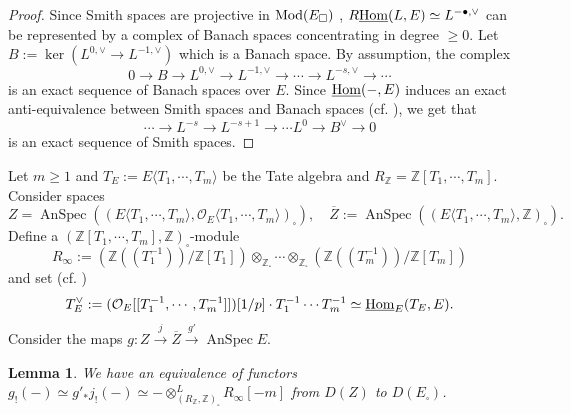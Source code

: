 \documentclass[a4paper,10pt]{amsart}
\theoremstyle{remark}
\theoremstyle{definition}
\theoremstyle{plain}
\newtheorem{lemma}[theorem]{Lemma}
\numberwithin{equation}{section}
\newcommand{\bbZ}{{\mathbb Z}}
\newcommand{\calO}{{\mathcal O}}
\newcommand{\Hom}{{\rm Hom}}
\newcommand{\uHom}{\underline{\Hom}}
\newcommand{\Mod}{{\rm Mod}}
\DeclareMathOperator{\AnSpec}{AnSpec}
\begin{document}
\begin{proof}
	Since Smith spaces are projective in $\Mod(E_{\square})$ \cite[Lem.~3.8]{rodrigues2022solid}, $R\uHom(L,E)\simeq L^{-\bullet,\vee}$ can be represented by a complex of Banach spaces concentrating  in degree $\geq 0$. Let $B:=\ker(L^{0,\vee}\to L^{-1,\vee})$ which is a Banach space. By assumption, the complex
	$$ 0\to B\to L^{0,\vee}\to L^{-1,\vee}\to \cdots \to L^{-s,\vee}\to \cdots $$
	 is an exact sequence of Banach spaces over $E$. Since $\underline{\Hom}(-,E)$ induces an exact anti-equivalence between Smith spaces and Banach spaces (cf. \cite[Thm.~3.40(1)]{rodrigues2022solid}), we get that
	 $$\cdots \to L^{-s}\to L^{-s+1}\to \cdots L^0\to B^{\vee}\to 0$$ 
	 is an exact sequence of Smith spaces.
\end{proof}

Let $m\geq 1$ and $T_E:= E\langle T_1,\cdots,T_m\rangle$ be the Tate algebra and $R_{\bbZ}=\bbZ[T_1,\cdots,T_m]$. Consider spaces 
\begin{equation}\label{equationspacesZbarZ}
	Z=\AnSpec((E\langle T_1,\cdots,T_m\rangle,\calO_E\langle T_1,\cdots,T_m\rangle)_\square), \quad \overline{Z}:=\AnSpec((E\langle T_1,\cdots,T_m\rangle,\bbZ)_\square).	
\end{equation}
Define a $(\bbZ[T_1,\cdots,T_m],\bbZ)_\square$-module
\[R_{\infty}:=(\bbZ((T_1^{-1}))/\bbZ[T_1])\otimes_{\bbZ_\square}\cdots\otimes_{\bbZ_\square} (\bbZ((T_m^{-1}))/\bbZ[T_m])\] 
and set (cf. \cite[Lem.~2.16]{rodrigues2022solid})
\[T_E^{\vee}:=(\calO_E[[T_1^{-1},\cdots,T_m^{-1}]])[1/p]\cdot T_1^{-1}\cdots T_m^{-1}\simeq \uHom_{E}(T_E,E).\] 
Consider the maps 
$g:Z\stackrel{j}\longrightarrow \overline{Z}\stackrel{g'}\longrightarrow \AnSpec E.$

\begin{lemma}\label{lemma:compact-support-tensor}
	We have an equivalence of functors $g_!(-)\simeq g'_*j_!(-)\simeq -\otimes^L_{(R_{\bbZ},\bbZ)_\square} R_{\infty}[-m]$ from $D(Z)$ to $D(E_\square)$.
\end{lemma}
\end{document}
